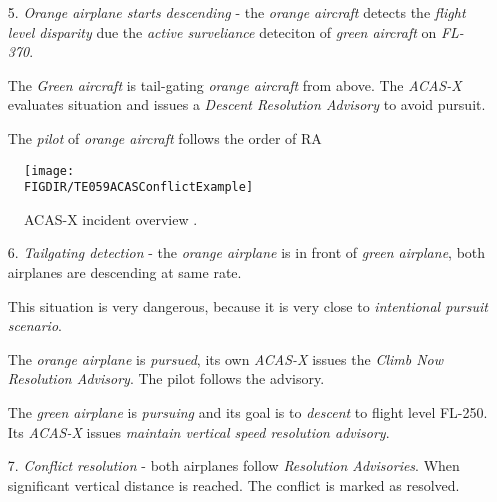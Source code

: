 \begin{itemize}
    \item[5.] \emph{Orange airplane starts descending} -  the \emph{orange aircraft} detects the \emph{flight level disparity} due the \emph{active surveliance} deteciton of \emph{green aircraft} on \emph{FL-370}.
    
    The \emph{Green aircraft} is tail-gating \emph{orange aircraft} from above. The \emph{ACAS-X} evaluates situation and issues a \emph{Descent Resolution Advisory} to avoid pursuit. 
    
    The \emph{pilot} of \emph{orange aircraft} follows the order of RA
\end{itemize}


\begin{figure}[H]
    \centering
    \texttt{[image: \\FIGDIR/TE059ACASConflictExample]}
    \caption{ACAS-X incident overview \cite{netalert2013n17}.}
    \label{fig:axasxincidentoverviewexample}
\end{figure}

\begin{itemize}
    \item[6.] \emph{Tailgating detection} - the \emph{orange airplane} is in front of \emph{green airplane}, both airplanes are descending at same rate. 
    
    \begin{note}
        This situation is very dangerous, because it is very close to \emph{intentional pursuit scenario}.
    \end{note}
    
    The \emph{orange airplane} is \emph{pursued}, its own \emph{ACAS-X} issues the \emph{Climb Now Resolution Advisory}. The pilot follows the advisory.
    
    The \emph{green airplane} is \emph{pursuing} and its goal is to \emph{descent} to flight level FL-250. Its \emph{ACAS-X} issues \emph{maintain vertical speed resolution advisory}.
    
    \item[7.] \emph{Conflict resolution} - both airplanes follow \emph{Resolution Advisories}.  When significant vertical distance is reached. The conflict is marked as resolved. 
\end{itemize}

